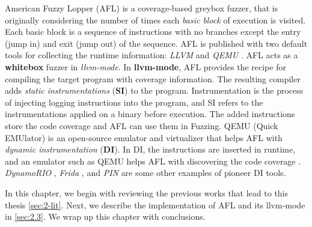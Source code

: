 American Fuzzy Lopper (AFL) \cite{afl_git} is a coverage-based greybox fuzzer, that is originally considering the number of times each \textit{basic block} of execution is visited. Each basic block is a sequence of instructions with no branches except the entry (jump in) and exit (jump out) of the sequence. AFL is published with two default tools for collecting the runtime information: \textit{LLVM} \cite{llvm} and \textit{QEMU} \cite{bellard2005qemu}.  AFL acts as a \textbf{whitebox} fuzzer in \textit{llvm-mode}. In \textbf{llvm-mode}, AFL provides the recipe for compiling the target program with coverage information. The resulting compiler adds \textit{static instrumentations} (\textbf{SI}) to the program. Instrumentation is the process of injecting logging instructions into the program, and SI refers to the instrumentations applied on a binary before execution. The added instructions store the code coverage and AFL can use them in Fuzzing. QEMU (Quick EMUlator) is an open-source emulator and virtualizer that helps AFL with \textit{dynamic instrumentation} (\textbf{DI}). In DI, the instructions are inserted in runtime, and an emulator such as QEMU helps AFL with discovering the code coverage \cite{afl_qemu}. \textit{DynamoRIO} \cite{dynamorio}, \textit{Frida} \cite{frida}, and \textit{PIN} \cite{pin} are some other examples of pioneer DI tools.

In this chapter, we begin with reviewing the previous works that lead to this thesis \ref{sec:2-lit}. Next, we describe the implementation of AFL and its llvm-mode in \ref{sec:2.3}. We wrap up this chapter with conclusions.
